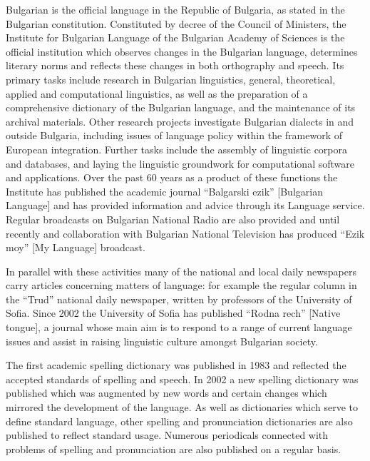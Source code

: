\documentclass[]{../../metanetpaper}
\begin{document}
\begin{multicols}{2}
Bulgarian is the official language in the Republic of Bulgaria, as stated in the Bulgarian constitution. Constituted by decree of the Council of Ministers, the Institute for Bulgarian Language of the Bulgarian Academy of Sciences is the official institution which observes changes in the Bulgarian language, determines literary norms and reflects these changes in both orthography and speech. Its primary tasks include research in Bulgarian linguistics, general, theoretical, applied and computational linguistics, as well as the preparation of a comprehensive dictionary of the Bulgarian language, and the maintenance of its archival materials. Other research projects investigate Bulgarian dialects in and outside Bulgaria, including issues of language policy within the framework of European integration. Further tasks include the assembly of linguistic corpora and databases, and laying the linguistic groundwork for computational software and applications. Over the past 60 years as a 
 product of these functions the Institute has published the academic journal ``Balgarski ezik'' [Bulgarian Language] and has provided information and advice through its Language service. Regular broadcasts on Bulgarian National Radio are also provided and until recently and collaboration with Bulgarian National Television has produced ``Ezik moy'' [My Language] broadcast. 

In parallel with these activities many of the national and local daily newspapers carry articles concerning matters of language: for example the regular column in the ``Trud'' national daily newspaper, written by professors of the University of Sofia. Since 2002 the University of Sofia has published ``Rodna rech'' [Native tongue], a journal whose main aim is to respond to a range of current language issues and assist in raising linguistic culture amongst Bulgarian society. 


The first academic spelling dictionary was published in 1983 and reflected the accepted standards of spelling and speech. In 2002 a new spelling dictionary was published which was augmented by new words and certain changes which mirrored the development of the language. As well as dictionaries which serve to define standard language, other spelling and pronunciation dictionaries are also published to reflect standard usage. Numerous periodicals connected with problems of spelling and pronunciation are also published on a regular basis. 


\end{multicols}
\end{document}
